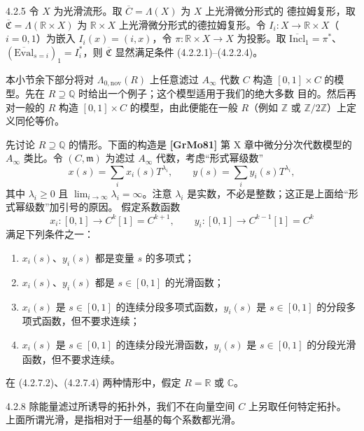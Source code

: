 \begin{example}{4.2.5}\label{ex:4-2-5}
令 $X$ 为光滑流形。取 $\overline C=\Lambda(X)$ 为 $X$ 上光滑微分形式的
德拉姆复形，取 $\overline{\mathfrak C}=\Lambda(\mathbb R\times X)$ 为
$\mathbb R\times X$ 上光滑微分形式的德拉姆复形。令
$I_i\colon X\to\mathbb R\times X$（$i=0,1$）为嵌入
$I_i(x)=(i,x)$，令 $\pi\colon\mathbb R\times X\to X$ 为投影。取
$\overline{\mathrm{Incl}}_1=\pi^*$、
$(\overline{\mathrm{Eval}}_{s=i})_1=I_i^*$，则
$\overline{\mathfrak C}$ 显然满足条件 (4.2.2.1)--(4.2.2.4)。
\end{example}

本小节余下部分将对 $\Lambda_{0,\mathrm{nov}}(R)$ 上任意滤过
$A_\infty$ 代数 $C$ 构造 $[0,1]\times C$ 的模型。先在
$R\supseteq\mathbb Q$ 时给出一个例子；这个模型适用于我们的绝大多数
目的。然后再对一般的 $R$ 构造 $[0,1]\times C$ 的模型，由此便能在一般
$R$（例如 $\mathbb Z$ 或 $\mathbb Z/2\mathbb Z$）上定义同伦等价。

先讨论 $R\supseteq\mathbb Q$ 的情形。下面的构造是
\textbf{[GrMo81]} 第 X 章中微分分次代数模型的 $A_\infty$ 类比。令
$(C,\mathfrak m)$ 为滤过 $A_\infty$ 代数，考虑“形式幂级数”
\begin{equation}
 x(s)=\sum_i x_i(s)T^{\lambda_i},
 \qquad
 y(s)=\sum_i y_i(s)T^{\lambda_i},
\tag{4.2.6}\label{eq:4-2-6}
\end{equation}
其中 $\lambda_i\geq0$ 且 $\lim_{i\to\infty}\lambda_i=\infty$。注意
$\lambda_i$ 是实数，不必是整数；这正是上面给“形式幂级数”加引号的原因。
假定系数函数
\[
 x_i\colon[0,1]\longrightarrow C^k[1]=C^{k+1},
 \qquad
 y_i\colon[0,1]\longrightarrow C^{k-1}[1]=C^k
\]
满足下列条件之一：
\begin{enumerate}[label=\textup{(4.2.7.\arabic*)},leftmargin=5.4em]
 \item $x_i(s)$、$y_i(s)$ 都是变量 $s$ 的多项式；
 \item $x_i(s)$、$y_i(s)$ 都是 $s\in[0,1]$ 的光滑函数；
 \item $x_i(s)$ 是 $s\in[0,1]$ 的连续分段多项式函数，$y_i(s)$ 是
  $s\in[0,1]$ 的分段多项式函数，但不要求连续；
 \item $x_i(s)$ 是 $s\in[0,1]$ 的连续分段光滑函数，$y_i(s)$ 是
  $s\in[0,1]$ 的分段光滑函数，但不要求连续。
\end{enumerate}
在 (4.2.7.2)、(4.2.7.4) 两种情形中，假定 $R=\mathbb R$ 或
$\mathbb C$。

\begin{remark}{4.2.8}\label{rem:4-2-8}
除能量滤过所诱导的拓扑外，我们不在向量空间 $C$ 上另取任何特定拓扑。
上面所谓光滑，是指相对于一组基的每个系数都光滑。
\end{remark}

